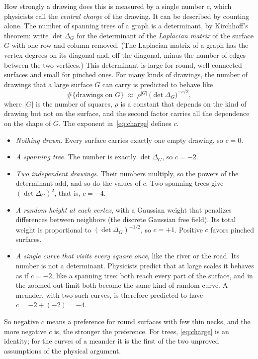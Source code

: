 How strongly a drawing does this is measured by a single number $c$, which physicists call the
\emph{central charge} of the drawing. It can be described by counting alone. The number of
spanning trees of a graph is a determinant, by Kirchhoff's theorem: write $\det\Delta_G$ for the
determinant of the \emph{Laplacian matrix} of the surface $G$ with one row and column removed.
(The Laplacian matrix of a graph has the vertex degrees on its diagonal and, off the diagonal,
minus the number of edges between the two vertices.) This determinant is large for round,
well-connected surfaces and small for pinched ones. For many kinds of drawings, the number of
drawings that a large surface $G$ can carry is predicted to behave like
\begin{equation}\label{eq:charge}
\#\{\text{drawings on } G\} \;\approx\; \rho^{|G|}\,\big(\det\Delta_G\big)^{-c/2},
\end{equation}
where $|G|$ is the number of squares, $\rho$ is a constant that depends on the kind of drawing but
not on the surface, and the second factor carries all the dependence on the shape of $G$. The
exponent in~\eqref{eq:charge} defines $c$.
\begin{itemize}
\item \emph{Nothing drawn.} Every surface carries exactly one empty drawing, so $c=0$.
\item \emph{A spanning tree.} The number is exactly $\det\Delta_G$, so $c=-2$.
\item \emph{Two independent drawings.} Their numbers multiply, so the powers of the determinant
add, and so do the values of $c$. Two spanning trees give $(\det\Delta_G)^2$, that is, $c=-4$.
\item \emph{A random height at each vertex}, with a Gaussian weight that penalizes differences
between neighbors (the discrete Gaussian free field). Its total weight is proportional to
$(\det\Delta_G)^{-1/2}$, so $c=+1$. Positive $c$ favors pinched surfaces.
\item \emph{A single curve that visits every square once}, like the river or the road. Its number
is not a determinant. Physicists predict that at large scales it behaves as if $c=-2$, like a
spanning tree: both reach every part of the surface, and in the zoomed-out limit both become the
same kind of random curve. A meander, with two such curves, is therefore predicted to have
$c=-2+(-2)=-4$.
\end{itemize}
So negative $c$ means a preference for round surfaces with few thin necks, and the more negative
$c$ is, the stronger the preference. For trees, \eqref{eq:charge} is an identity; for the curves of
a meander it is the first of the two unproved assumptions of the physical argument.

